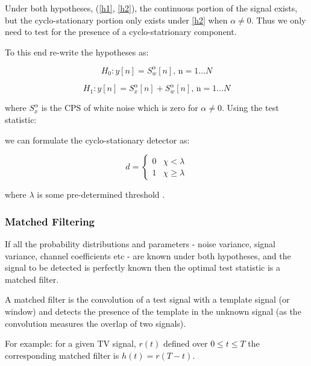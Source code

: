 Under both hypotheses, (\ref{h1}, \ref{h2}), the continuous portion of the signal exists, but the cyclo-stationary portion only exists under \ref{h2} when \(\alpha \neq 0\). Thus we only need to test for the presence of a cyclo-statrionary component. 

To this end re-write the hypotheses as:

\begin{equation}
H_{0}: y\left[n\right] = S_{w}^\alpha \left[n\right] \text{, n} =  1 \ldots N 
\end{equation}
\label{c1}

\begin{equation}
H_{1}: y\left[n \right] = S_{x}^{\alpha} \left[n\right] + S_{w}^{\alpha} \left[n\right] \text{, n} =  1 \ldots N 
\end{equation}
\label{c2}

where \(S_{x}^{\alpha}\) is the CPS of white noise which is zero for \(\alpha \neq 0 \). Using the test statistic:



we can formulate the cyclo-stationary detector as:

\begin{equation}
 d =
  \begin{cases}
   0 & \chi < \lambda  \\
   1 & \chi \geq \lambda
  \end{cases}
\end{equation}

where \(\lambda\) is some pre-determined threshold \cite{Ghozzi2006}. 

\subsubsection{Matched Filtering}
If all the probability distributions and parameters  - noise variance, signal variance, channel coefficients etc - are known under both hypotheses, and the signal to be detected is perfectly known then the optimal test statistic is a matched filter.

A matched filter is the convolution of a test signal with a template signal (or window) and detects the presence of the template in the unknown signal (as the convolution measures the overlap of two signals).

For example: for a given TV signal, \(r\left(t\right)\) defined over \(0 \leq t \leq T\) the corresponding matched filter is \(h\left(t\right) = r\left(T - t\right)\). 

